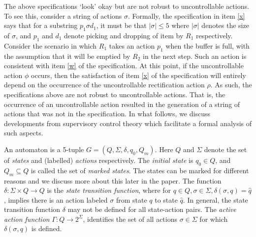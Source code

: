 \documentclass[letterpaper, 10 pt, conference]{ieeeconf}
\begin{document}
The above specifications `look' okay but are not robust to uncontrollable actions. To see this, consider a string of actions $\sigma$. Formally, the specification in item \ref{x} says that for a substring $p_1\sigma d_1$, it must be that $|\sigma| \leq 5$ where $|\sigma|$ denotes the size of $\sigma$, and $p_1$ and $d_1$ denote picking and dropping of item by $R_1$ respectively. Consider the scenario in which $R_1$ takes an action $p_1$ when the buffer is full, with the assumption that it will be emptied by $R_2$ in the next step. Such an action is consistent with item \ref{w} of the specification. At this point, if the uncontrollable action $\phi$ occurs, then the satisfaction of item \ref{x} of the specification will entirely depend on the occurrence of the uncontrollable rectification action $\rho$. As such, the specifications above are not robust to uncontrollable actions. That is, the occurrence of an uncontrollable action resulted in the generation of a string of actions that was not in the specification. In what follows, we discuss developments from supervisory control theory which facilitate a formal analysis of such aspects.

An automaton is a 5-tuple $G=(Q, \Sigma, \delta, q_0, Q_m)$\cite{cassandras2009introduction}. Here $Q$ and $\Sigma$ denote the set of \textit{states} and (labelled) \textit{actions} respectively. The \textit{initial state} is $q_0 \in Q$, and $Q_m \subseteq Q$ is called the set of \textit{marked states}. The states can be marked for different reasons and we discuss more about this later in the paper. The function $\delta: \Sigma \times Q \rightarrow Q$ is the \textit{state transition function}, where for $q \in Q, \sigma \in \Sigma, \delta(\sigma, q) = \widehat{q}$, implies there is an action labeled $\sigma$ from state $q$ to state $\widehat{q}$. In general, the state transition function $\delta$ may not be defined for all state-action pairs. The \textit{active action function} $\Gamma: Q \rightarrow 2^{\Sigma}$, identifies the set of all actions $\sigma \in \Sigma$ for which $\delta(\sigma, q)$ is defined. 
\end{document}
